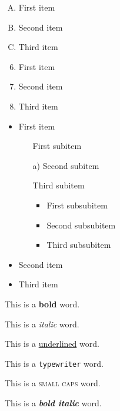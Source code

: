 \documentclass[11pt]{article}
\begin{document}
\vspace{1cm}

\begin{enumerate}[A.]
    \item First item
    \item Second item
    \item Third item
\end{enumerate}

\vspace{1cm}

\begin{enumerate} \setcounter{enumi}{5}
    \item First item
    \item Second item
    \item Third item
\end{enumerate}

\vspace{1cm}

\begin{itemize}
    \item First item
    \begin{itemize}
        \item[] First subitem
        \item[a)] Second subitem
        \item[] Third subitem
        \begin{itemize}
            \item First subsubitem
            \item Second subsubitem
            \item Third subsubitem
        \end{itemize}
    \end{itemize}
    \item Second item
    \item Third item
\end{itemize}


\pagebreak

This is a \textbf{bold} word.

This is a \textit{italic} word.

This is a \underline{underlined} word.

This is a \texttt{typewriter} word.

This is a \textsc{small caps} word.

This is a \textbf{\textit{bold italic}} word.

\vspace{1cm}
\end{document}
